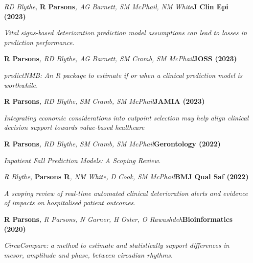 \item
    \textit{RD Blythe, }\textbf{R Parsons}\textit{, AG Barnett, SM McPhail, NM White}\textbf{\hfill{J Clin Epi (2023)}}\par
    \textit{Vital signs-based deterioration prediction model assumptions can lead to losses in prediction performance.}
\item
    \textbf{R Parsons}\textit{, RD Blythe, AG Barnett, SM Cramb, SM McPhail}\textbf{\hfill{JOSS (2023)}}\par
    \textit{predictNMB: An R package to estimate if or when a clinical prediction model is worthwhile.}
\item
    \textbf{R Parsons}\textit{, RD Blythe, SM Cramb, SM McPhail}\textbf{\hfill{JAMIA (2023)}}\par
    \textit{
        Integrating economic considerations into cutpoint selection may help align clinical decision support \newline
        towards value-based healthcare
    }
\item
    \textbf{R Parsons}\textit{, RD Blythe, SM Cramb, SM McPhail}\textbf{\hfill Gerontology (2022)}\par
	\textit{Inpatient Fall Prediction Models: A Scoping Review.}
\item
	\textit{R Blythe, }\textbf{Parsons R}\textit{, NM White, D Cook, SM McPhail}\textbf{\hfill{BMJ Qual Saf (2022)}}\par
	\textit{A scoping review of real-time automated clinical deterioration alerts and evidence of impacts on hospitalised patient outcomes.}
\item
    \textbf{R Parsons}\textit{, R Parsons, N Garner, H Oster, O Rawashdeh}\textbf{\hfill Bioinformatics (2020)}\par 
    \textit{CircaCompare: a method to estimate and statistically support differences in mesor, amplitude and phase, between circadian rhythms.}
